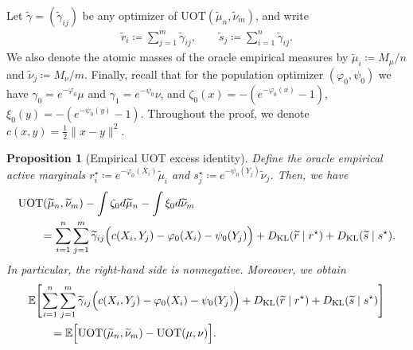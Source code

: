 \documentclass[11pt,reqno]{amsart}
\newtheorem{proposition}[theorem]{Proposition}
\theoremstyle{definition}
\newcommand{\KL}{\mathrm{KL}}
\renewcommand{\tilde}{\widetilde}
\newcommand{\Ep}{\mathbb{E}}
\begin{document}
Let $\tilde\gamma=(\tilde\gamma_{ij})$ be any optimizer of $\mathrm{UOT}(\tilde\mu_n,\tilde\nu_m)$, and write
\begin{align}
    \tilde r_i \coloneqq \sum_{j=1}^m \tilde\gamma_{ij},
    \qquad
    \tilde s_j \coloneqq \sum_{i=1}^n \tilde\gamma_{ij}.
\end{align}
We also denote the atomic masses of the oracle empirical measures by
    $\tilde\mu_i \coloneqq {M_\mu} / {n}$ and $ \tilde\nu_j \coloneqq {M_\nu} / {m}$.
Finally, recall that for the population optimizer $(\varphi_0,\psi_0)$ we have
    $\gamma_0 = e^{-\varphi_0}\mu$ and $
    \gamma_1 = e^{-\psi_0}\nu$,
and $\zeta_0(x)= -(e^{-\varphi_0(x)}-1)$, $\xi_0(y)= -(e^{-\psi_0(y)}-1)$. Throughout the proof, we denote $c(x,y) = \tfrac{1}{2} \| x - y \|^2$.



\begin{proposition}[Empirical UOT excess identity]
\label{prop:uot_exact_empirical_excess}
Define the oracle empirical active marginals
$r_i^\star \coloneqq e^{-\varphi_0(X_i)}\tilde\mu_i$ and $s_j^\star \coloneqq e^{-\psi_0(Y_j)}\tilde\nu_j$.
Then, we have
\begin{equation}
\label{eq:uot_exact_empirical_excess}
\begin{aligned}
&\mathrm{UOT}(\tilde\mu_n,\tilde\nu_m)
- \int \zeta_0  d\tilde\mu_n
- \int \xi_0  d\tilde\nu_m \\
&\qquad=
\sum_{i=1}^n\sum_{j=1}^m
\tilde\gamma_{ij}
\Bigl(
c(X_i,Y_j)-\varphi_0(X_i)-\psi_0(Y_j)
\Bigr) 
+ {D_\KL}(\tilde r \mid r^\star)
+ {D_\KL}(\tilde s \mid s^\star).
\end{aligned}
\end{equation}
In particular, the right-hand side is nonnegative.
Moreover, we obtain
\begin{equation}
\label{eq:uot_exact_empirical_excess_expectation}
\begin{aligned}
&\Ep\Biggl[
\sum_{i=1}^n\sum_{j=1}^m
\tilde\gamma_{ij}
\Bigl(
c(X_i,Y_j)-\varphi_0(X_i)-\psi_0(Y_j)
\Bigr)
+ {D_\KL}(\tilde r \mid r^\star)
+ {D_\KL}(\tilde s \mid s^\star)
\Biggr] \\
&\qquad=
\Ep\Bigl[
\mathrm{UOT}(\tilde\mu_n,\tilde\nu_m) - \mathrm{UOT}(\mu,\nu)
\Bigr].
\end{aligned}
\end{equation}
\end{proposition}
\end{document}
